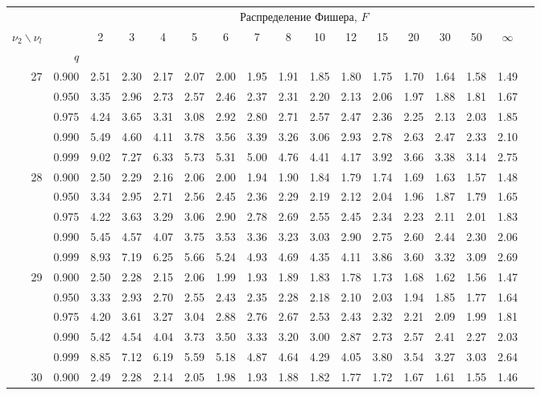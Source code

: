 {\begin{center}
\begin{tabular}{rrr@{\,}r@{\,}r@{\,}r@{\,}r@{\,}r@{\,}r@{\,}r
                   @{\,}r@{\,}r@{\,}r@{\,}r@{\,}r@{\,}r@{\,}r}
&&\multicolumn{14}{c}{Распределение Фишера, $F$}
\ \\
$\nu_2\backslash\nu_l$ & & 
\multicolumn{1}{c}{2} &\multicolumn{1}{c}{3} &
\multicolumn{1}{c}{4} &\multicolumn{1}{c}{5} &
\multicolumn{1}{c}{6} &\multicolumn{1}{c}{7} &
\multicolumn{1}{c}{8} &\multicolumn{1}{c}{10}&
\multicolumn{1}{c}{12}&\multicolumn{1}{c}{15}&
\multicolumn{1}{c}{20}&\multicolumn{1}{c}{30}&
\multicolumn{1}{c}{50}&\multicolumn{1}{c}{$\infty$}\\
& $q$ \\
27&0.900&2.51&2.30&2.17&2.07&2.00&1.95&1.91&1.85&1.80&1.75&1.70&1.64&1.58&1.49\\
  &0.950&3.35&2.96&2.73&2.57&2.46&2.37&2.31&2.20&2.13&2.06&1.97&1.88&1.81&1.67\\
  &0.975&4.24&3.65&3.31&3.08&2.92&2.80&2.71&2.57&2.47&2.36&2.25&2.13&2.03&1.85\\
  &0.990&5.49&4.60&4.11&3.78&3.56&3.39&3.26&3.06&2.93&2.78&2.63&2.47&2.33&2.10\\
  &0.999&9.02&7.27&6.33&5.73&5.31&5.00&4.76&4.41&4.17&3.92&3.66&3.38&3.14&2.75\\
28&0.900&2.50&2.29&2.16&2.06&2.00&1.94&1.90&1.84&1.79&1.74&1.69&1.63&1.57&1.48\\
  &0.950&3.34&2.95&2.71&2.56&2.45&2.36&2.29&2.19&2.12&2.04&1.96&1.87&1.79&1.65\\
  &0.975&4.22&3.63&3.29&3.06&2.90&2.78&2.69&2.55&2.45&2.34&2.23&2.11&2.01&1.83\\
  &0.990&5.45&4.57&4.07&3.75&3.53&3.36&3.23&3.03&2.90&2.75&2.60&2.44&2.30&2.06\\
  &0.999&8.93&7.19&6.25&5.66&5.24&4.93&4.69&4.35&4.11&3.86&3.60&3.32&3.09&2.69\\
29&0.900&2.50&2.28&2.15&2.06&1.99&1.93&1.89&1.83&1.78&1.73&1.68&1.62&1.56&1.47\\
  &0.950&3.33&2.93&2.70&2.55&2.43&2.35&2.28&2.18&2.10&2.03&1.94&1.85&1.77&1.64\\
  &0.975&4.20&3.61&3.27&3.04&2.88&2.76&2.67&2.53&2.43&2.32&2.21&2.09&1.99&1.81\\
  &0.990&5.42&4.54&4.04&3.73&3.50&3.33&3.20&3.00&2.87&2.73&2.57&2.41&2.27&2.03\\
  &0.999&8.85&7.12&6.19&5.59&5.18&4.87&4.64&4.29&4.05&3.80&3.54&3.27&3.03&2.64\\
30&0.900&2.49&2.28&2.14&2.05&1.98&1.93&1.88&1.82&1.77&1.72&1.67&1.61&1.55&1.46\\

\end{tabular}
\end{center}}
